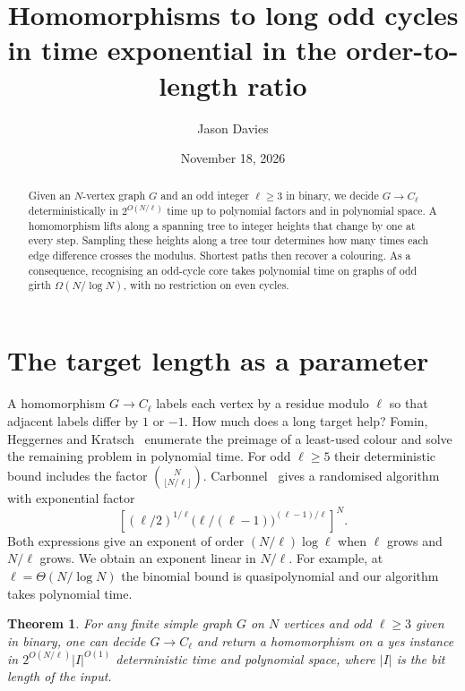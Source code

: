 \documentclass[11pt]{article}
\title{Homomorphisms to long odd cycles in time exponential in the order-to-length ratio}
\author{Jason Davies}
\date{November 18, 2026}
\newtheorem{theorem}{Theorem}
\begin{document}
\maketitle

\begin{abstract}
Given an $N$-vertex graph $G$ and an odd integer $\ell\geq3$ in binary,
we decide $G\to C_\ell$ deterministically in $2^{O(N/\ell)}$ time up to
polynomial factors and in polynomial space. A homomorphism lifts along
a spanning tree to integer heights that change by one at every step.
Sampling these heights along a tree tour determines how many times each
edge difference crosses the modulus. Shortest paths then recover a
colouring. As a consequence, recognising an odd-cycle core takes
polynomial time on graphs of odd girth $\Omega(N/\log N)$, with no
restriction on even cycles.
\end{abstract}

\section{The target length as a parameter}
A homomorphism $G\to C_\ell$ labels each vertex by a residue modulo $\ell$
so that adjacent labels differ by $1$ or $-1$. How much does a long
target help? Fomin, Heggernes and Kratsch~\cite{fhk} enumerate the
preimage of a least-used colour and solve the remaining problem in
polynomial time. For odd $\ell\geq5$ their deterministic bound includes
the factor $\binom{N}{\lfloor N/\ell\rfloor}$. Carbonnel~\cite[Theorem~2]{carbonnel}
gives a randomised algorithm with exponential factor
\[
 \left[(\ell/2)^{1/\ell}
       \bigl(\ell/(\ell-1)\bigr)^{(\ell-1)/\ell}\right]^N .
\]
Both expressions give an exponent of order $(N/\ell)\log\ell$ when
$\ell$ grows and $N/\ell$ grows. We obtain an exponent linear in
$N/\ell$. For example, at $\ell=\Theta(N/\log N)$ the binomial bound is
quasipolynomial and our algorithm takes polynomial time.

\begin{theorem}\label{thm:long}
For any finite simple graph $G$ on $N$ vertices and odd $\ell\geq3$
given in binary, one can decide $G\to C_\ell$ and return a homomorphism
on a yes instance in $2^{O(N/\ell)}|I|^{O(1)}$ deterministic time and
polynomial space, where $|I|$ is the bit length of the input.
\end{theorem}
\end{document}
